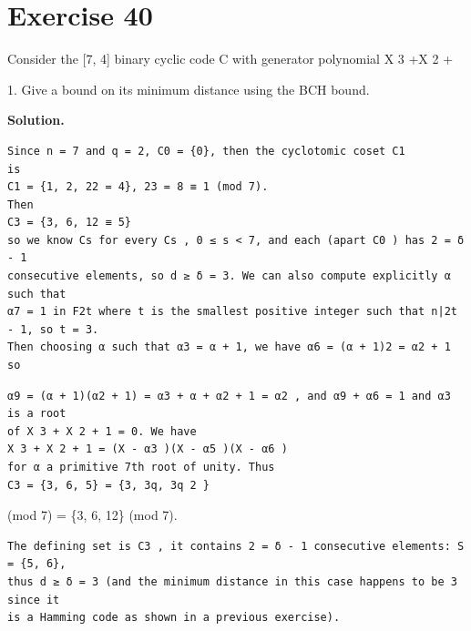 \documentclass[11pt]{article}
\begin{document}
\section*{Exercise 40}
\begin{exercisebox}
Consider the [7, 4] binary cyclic code C with generator polynomial X 3 +X 2 +

1. Give a bound on its minimum distance using the BCH bound.

\end{exercisebox}
\begin{solutionbox}
\textbf{Solution.}

\begin{Verbatim}[fontsize=\small]
Since n = 7 and q = 2, C0 = {0}, then the cyclotomic coset C1
is
C1 = {1, 2, 22 = 4}, 23 = 8 ≡ 1 (mod 7).
Then
C3 = {3, 6, 12 ≡ 5}
so we know Cs for every Cs , 0 ≤ s < 7, and each (apart C0 ) has 2 = δ - 1
consecutive elements, so d ≥ δ = 3. We can also compute explicitly α such that
α7 = 1 in F2t where t is the smallest positive integer such that n|2t - 1, so t = 3.
Then choosing α such that α3 = α + 1, we have α6 = (α + 1)2 = α2 + 1 so
\end{Verbatim}
\begin{Verbatim}[fontsize=\small]
α9 = (α + 1)(α2 + 1) = α3 + α + α2 + 1 = α2 , and α9 + α6 = 1 and α3 is a root
of X 3 + X 2 + 1 = 0. We have
X 3 + X 2 + 1 = (X - α3 )(X - α5 )(X - α6 )
for α a primitive 7th root of unity. Thus
C3 = {3, 6, 5} = {3, 3q, 3q 2 }
\end{Verbatim}
(mod 7) = \{3, 6, 12\} (mod 7).

\begin{Verbatim}[fontsize=\small]
The defining set is C3 , it contains 2 = δ - 1 consecutive elements: S = {5, 6},
thus d ≥ δ = 3 (and the minimum distance in this case happens to be 3 since it
is a Hamming code as shown in a previous exercise).
\end{Verbatim}
\end{solutionbox}
\end{document}
